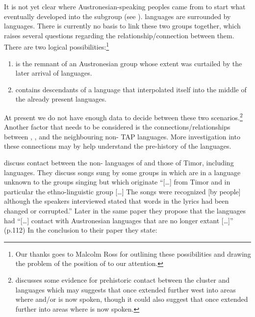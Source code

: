 It is not yet clear where Austronesian-speaking peoples came
from to start what eventually developed into the  subgroup (see ).
 languages are surrounded by  languages.
There is currently no basis to link these two groups together,
which raises several questions regarding the relationship/connection between them.
There are two logical possibilities:\footnote{
		Our thanks goes
		to Malcolm Ross for outlining these possibilities
		and drawing the problem of the position of 
		to our attention.}

\begin{enumerate}
	\item	{} is the remnant of an Austronesian group
				whose extent was curtailed by the later arrival of  languages.
	\item	{} contains descendants of a language
				that interpolated itself into the middle of the
				already present  languages.
\end{enumerate}

At present we do not have enough data to decide between these
two scenarios.\footnote{
		\citet[67f]{Edwards2021} discusses some evidence for prehistoric contact between the 
		cluster and  languages which may suggests that  once extended further west into areas where  and/or
		 is now spoken,
		though it could also suggest that  once extended further
		 into areas where  is now spoken.}
Another factor that
needs to be considered is the connections/relationships between
, , and the neighbouring non- TAP languages.
More investigation into these connections may by help understand
the pre-history of the  languages.

\citet{SchapperWellfelt2018} discuss contact between the non-
languages of  and those of Timor,
including  languages.
They discuss songs sung by some groups in  which are in a
language unknown to the groups singing but which originate “[{\ldots}]
from Timor and in particular the  ethno-linguistic group [{\ldots}]
The songs were recognized [by  people] although the 
speakers interviewed stated that words in the lyrics had been
changed or corrupted.” Later in the same paper they propose that
the  languages had “[{\ldots}] contact with
Austronesian languages that are no longer extant [{\ldots}]”
(p.112) In the conclusion to their paper they state:

